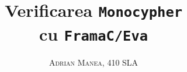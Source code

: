 \documentclass[12pt, a4paper]{book}
\begin{document}
\thispagestyle{empty}
\pagestyle{plain} %

\title{\Huge Verificarea \texttt{Monocypher} \\ cu \texttt{FramaC/Eva}}
\vspace{1cm}
\author{\Large\textsc{Adrian Manea, 410 SLA}}
\date{}

\maketitle

\tableofcontents

\setcounter{page}{1} %










\nocite{*}
\end{document}
